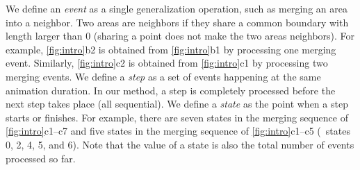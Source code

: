 \documentclass[twocolumn]{svjour3}          %
\begin{document}



We define an \emph{event} as a single generalization operation, 
such as merging an area into a neighbor.
Two areas are neighbors if 
they share a common boundary with length larger than 0
(sharing a point does not make the two areas neighbors).
For example, \fig\ref{fig:intro}b2 is obtained from 
\fig\ref{fig:intro}b1 by processing one merging event.
Similarly, \fig\ref{fig:intro}c2 is obtained from 
\fig\ref{fig:intro}c1 by processing two merging events.
We define a \emph{step} as 
a set of events happening at the same animation duration.
In our method, a step is completely processed 
before the next step takes place (all sequential).
We define a \emph{state} as the point when a step starts or finishes.
For example, there are seven states 
in the merging sequence of \figs\ref{fig:intro}c1--c7
and five states in the merging sequence of \figs\ref{fig:intro}c1--c5 
(\ie~states 0, 2, 4, 5, and 6).
Note that the value of a state is also 
the total number of events processed so far.
\end{document}
